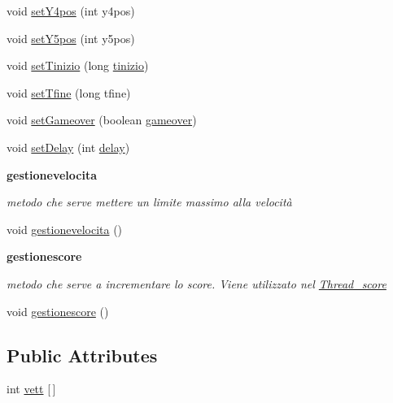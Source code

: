 \begin{Indent}
\begin{DoxyCompactItemize}
void \hyperlink{classcargame_1_1condivisa_a76b00ce7ba6b0f81a10fc9f4850a9233}{set\+Y4pos} (int y4pos)
\item 
void \hyperlink{classcargame_1_1condivisa_a3c187905ecd13a93abdacba7bf7b3176}{set\+Y5pos} (int y5pos)
\item 
void \hyperlink{classcargame_1_1condivisa_a062a34ec0119afcbcc5f60b70c27cef3}{set\+Tinizio} (long \hyperlink{classcargame_1_1condivisa_affe5d112c1c695c8d9225a4f5a98eede}{tinizio})
\item 
void \hyperlink{classcargame_1_1condivisa_a4a84cdccb50ce3a07a022dbca8b99fe3}{set\+Tfine} (long tfine)
\item 
void \hyperlink{classcargame_1_1condivisa_a69ebe98d89726ab5ee3c8bb7774d7541}{set\+Gameover} (boolean \hyperlink{classcargame_1_1condivisa_a5dabf0834c87a8496bdb1a69835a00f0}{gameover})
\item 
void \hyperlink{classcargame_1_1condivisa_a511f425b438de1dfc7952baa3422e055}{set\+Delay} (int \hyperlink{classcargame_1_1condivisa_a6f1be1f780ff54ec75b41451cd4d90bd}{delay})
\end{DoxyCompactItemize}
\end{Indent}
\begin{Indent}\textbf{ gestionevelocita}\par
{\em metodo che serve mettere un limite massimo alla velocità }\begin{DoxyCompactItemize}
\item 
void \hyperlink{classcargame_1_1condivisa_abadc979a444724e04bdd60433875b774}{gestionevelocita} ()
\end{DoxyCompactItemize}
\end{Indent}
\begin{Indent}\textbf{ gestionescore}\par
{\em metodo che serve a incrementare lo score. Viene utilizzato nel \hyperlink{classcargame_1_1_thread__score}{Thread\+\_\+score} }\begin{DoxyCompactItemize}
\item 
void \hyperlink{classcargame_1_1condivisa_aff555bd79e80391637df4bbe885ff837}{gestionescore} ()
\end{DoxyCompactItemize}
\end{Indent}
\subsection*{Public Attributes}
\begin{DoxyCompactItemize}
\item 
int \hyperlink{classcargame_1_1condivisa_a746b9c4007f853292a93ea2262ec190f}{vett} \mbox{[}$\,$\mbox{]}
\end{DoxyCompactItemize}
